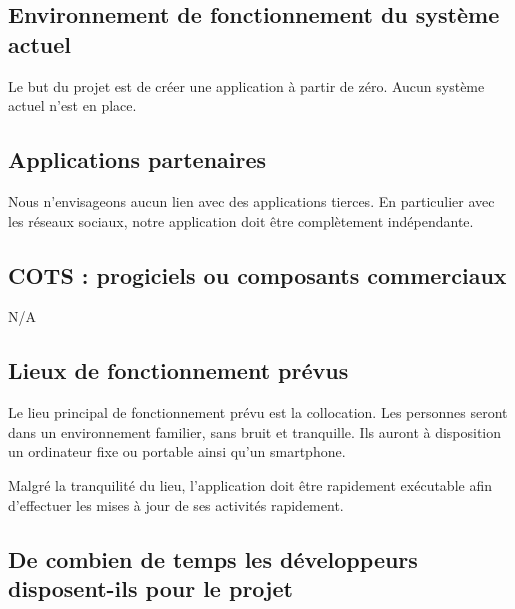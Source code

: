 
\subsection{Environnement de fonctionnement du système actuel} %
\label{sub:environnement_de_fonctionnement_du_syst_me_actuel}

	Le but du projet est de créer une application à partir de zéro. Aucun système actuel n'est en place.


\subsection{Applications partenaires} %
\label{sub:applications_partenaires}

	Nous n'envisageons aucun lien avec des applications tierces. En particulier avec les réseaux sociaux, notre application doit être complètement indépendante.


\subsection{COTS : progiciels ou composants commerciaux} %
\label{sub:cots_progiciels_ou_composants_commerciaux}

	N/A


\subsection{Lieux de fonctionnement prévus} %
\label{sub:lieux_de_fonctionnement_pr_vus}

	Le lieu principal de fonctionnement prévu est la collocation. Les personnes seront dans un environnement familier, sans bruit et tranquille. Ils auront à disposition un ordinateur fixe ou portable ainsi qu'un smartphone.

	Malgré la tranquilité du lieu, l'application doit être rapidement exécutable afin d'effectuer les mises à jour de ses activités rapidement.


\subsection{De combien de temps les développeurs disposent-ils pour le projet} %
\label{sub:de_combien_de_temps_les_d_veloppeurs_disposent_ils_pour_le_projet}

